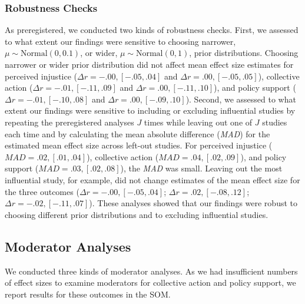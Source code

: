 \documentclass[12pt, letterpaper]{article}
\begin{document}
\hypertarget{robustness-checks}{%
\subsubsection{Robustness Checks}\label{robustness-checks}}

As preregistered, we conducted two kinds of robustness checks. First, we
assessed to what extent our findings were sensitive to choosing
narrower, \(\mu \sim \text{Normal}(0, 0.1)\), or wider,
\(\mu \sim \text{Normal}(0, 1)\), prior distributions. Choosing narrower
or wider prior distribution did not affect mean effect size estimates
for perceived injustice (\(\Delta r = -.00, [-.05, .04]\) and
\(\Delta r = .00, [-.05, .05]\)), collective action
(\(\Delta r = -.01, [-.11, .09]\) and \(\Delta r = .00, [-.11, .10]\)),
and policy support (\(\Delta r = -.01, [-.10, .08]\) and
\(\Delta r = .00, [-.09, .10]\)). Second, we assessed to what extent our
findings were sensitive to including or excluding influential studies by
repeating the preregistered analyses \(J\) times while leaving out one
of \(J\) studies each time and by calculating the mean absolute
difference (\emph{MAD}) for the estimated mean effect size across
left-out studies. For perceived injustice
(\(\textit{MAD} = .02, [.01, .04]\)), collective action
(\(\textit{MAD} = .04, [.02, .09]\)), and policy support
(\(\textit{MAD} = .03, [.02, .08]\)), the \emph{MAD} was small. Leaving
out the most influential study, for example, did not change estimates of
the mean effect size for the three outcomes
(\(\Delta r = -.00, [-.05, .04]\); \(\Delta r = .02, [-.08, .12]\);
\(\Delta r = -.02, [-.11, .07]\)). These analyses showed that our
findings were robust to choosing different prior distributions and to
excluding influential studies.

\hypertarget{moderator-analyses}{%
\subsection{Moderator Analyses}\label{moderator-analyses}}

We conducted three kinds of moderator analyses. As we had insufficient
numbers of effect sizes to examine moderators for collective action and
policy support, we report results for these outcomes in the SOM.
\end{document}
